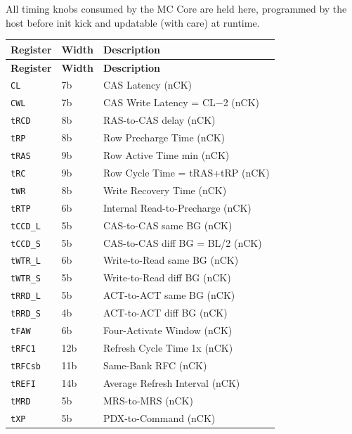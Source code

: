 \documentclass[11pt,a4paper]{article}
\newcommand{\reg}[1]{\textcolor{ddrpurple}{\texttt{#1}}}
\begin{document}
All timing knobs consumed by the MC Core are held here, programmed by the host
before init kick and updatable (with care) at runtime.

\begin{longtable}{L{3cm} L{2cm} L{9.3cm}}
\toprule
\textbf{Register} & \textbf{Width} & \textbf{Description} \\
\midrule
\endfirsthead\toprule\textbf{Register}&\textbf{Width}&\textbf{Description}\\\midrule\endhead\bottomrule\endfoot
{}
\reg{CL}          & 7b & CAS Latency (nCK) \\
\reg{CWL}         & 7b & CAS Write Latency = CL$-$2 (nCK) \\
\reg{tRCD}        & 8b & RAS-to-CAS delay (nCK) \\
\reg{tRP}         & 8b & Row Precharge Time (nCK) \\
\reg{tRAS}        & 9b & Row Active Time min (nCK) \\
\reg{tRC}         & 9b & Row Cycle Time = tRAS+tRP (nCK) \\
\reg{tWR}         & 8b & Write Recovery Time (nCK) \\
\reg{tRTP}        & 6b & Internal Read-to-Precharge (nCK) \\
\reg{tCCD\_L}     & 5b & CAS-to-CAS same BG (nCK) \\
\reg{tCCD\_S}     & 5b & CAS-to-CAS diff BG = BL/2 (nCK) \\
\reg{tWTR\_L}     & 6b & Write-to-Read same BG (nCK) \\
\reg{tWTR\_S}     & 5b & Write-to-Read diff BG (nCK) \\
\reg{tRRD\_L}     & 5b & ACT-to-ACT same BG (nCK) \\
\reg{tRRD\_S}     & 4b & ACT-to-ACT diff BG (nCK) \\
\reg{tFAW}        & 6b & Four-Activate Window (nCK) \\
\reg{tRFC1}       & 12b & Refresh Cycle Time 1x (nCK) \\
\reg{tRFCsb}      & 11b & Same-Bank RFC (nCK) \\
\reg{tREFI}       & 14b & Average Refresh Interval (nCK) \\
\reg{tMRD}        & 5b & MRS-to-MRS (nCK) \\
\reg{tXP}         & 5b & PDX-to-Command (nCK) \\

\end{longtable}
\end{document}
